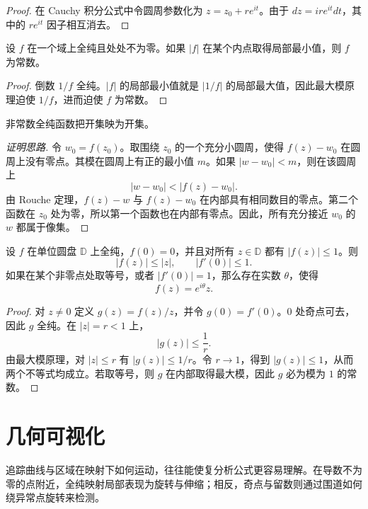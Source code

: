 \begin{proof}
在 Cauchy 积分公式中令圆周参数化为 $z=z_0+re^{it}$。由于 $dz=ire^{it}dt$，其中的 $re^{it}$ 因子相互消去。
\end{proof}

\begin{theorem}[最小模原理]
设 $f$ 在一个域上全纯且处处不为零。如果 $|f|$ 在某个内点取得局部最小值，则 $f$ 为常数。
\end{theorem}

\begin{proof}
倒数 $1/f$ 全纯。$|f|$ 的局部最小值就是 $|1/f|$ 的局部最大值，因此最大模原理迫使 $1/f$，进而迫使 $f$ 为常数。
\end{proof}

\begin{theorem}[开映射定理]
非常数全纯函数把开集映为开集。
\end{theorem}

\begin{proof}[证明思路]
令 $w_0=f(z_0)$。取围绕 $z_0$ 的一个充分小圆周，使得 $f(z)-w_0$ 在圆周上没有零点。其模在圆周上有正的最小值 $m$。如果 $|w-w_0|<m$，则在该圆周上
\[
    |w-w_0|<|f(z)-w_0|.
\]
由 Rouche 定理，$f(z)-w$ 与 $f(z)-w_0$ 在内部具有相同数目的零点。第二个函数在 $z_0$ 处为零，所以第一个函数也在内部有零点。因此，所有充分接近 $w_0$ 的 $w$ 都属于像集。
\end{proof}

\begin{theorem}[Schwarz 引理]
设 $f$ 在单位圆盘 $\mathbb{D}$ 上全纯，$f(0)=0$，并且对所有 $z\in\mathbb{D}$ 都有 $|f(z)|\leq1$。则
\[
    |f(z)|\leq|z|,
    \qquad
    |f'(0)|\leq1.
\]
如果在某个非零点处取等号，或者 $|f'(0)|=1$，那么存在实数 $\theta$，使得
\[
    f(z)=e^{i\theta}z.
\]
\end{theorem}

\begin{proof}
对 $z\neq0$ 定义 $g(z)=f(z)/z$，并令 $g(0)=f'(0)$。$0$ 处奇点可去，因此 $g$ 全纯。在 $|z|=r<1$ 上，
\[
    |g(z)|\leq\frac1r.
\]
由最大模原理，对 $|z|\leq r$ 有 $|g(z)|\leq1/r$。令 $r\to1$，得到 $|g(z)|\leq1$，从而两个不等式均成立。若取等号，则 $g$ 在内部取得最大模，因此 $g$ 必为模为 $1$ 的常数。
\end{proof}

\section{几何可视化}

追踪曲线与区域在映射下如何运动，往往能使复分析公式更容易理解。在导数不为零的点附近，全纯映射局部表现为旋转与伸缩；相反，奇点与留数则通过围道如何绕异常点旋转来检测。


